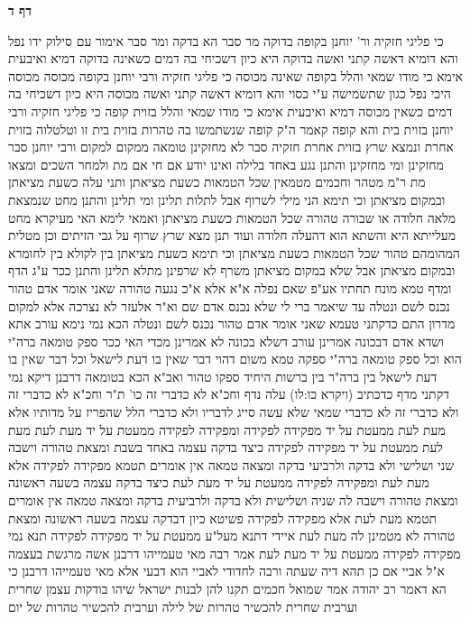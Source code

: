 \documentclass[12pt, openany]{book}
\newcommand{\sethebfont}{
\fontsize{10.5pt}{21.0pt} \selectfont
}
\newcommand{\twocol}[1]{
	{\sethebfont \begin{multicols}{2}
			#1
	\end{multicols}}	
}
\newcommand{\sectname}{}
\newcommand{\newsection}[1]{
	\addcontentsline{toc}{section}{#1}
	\renewcommand{\sectname}{#1}	
	\vspace{-\baselineskip}
	\begin{center}
		\textbf{%
\fontsize{16pt}{16pt}\selectfont
			#1}
	\end{center}
	\vspace{-\baselineskip}
	\nopagebreak
}
\begin{document}
\newsection{דף ד}
\twocol{כי פליגי חזקיה ור' יוחנן בקופה בדוקה מר סבר הא בדקה ומר סבר אימור עם סילוק ידו נפל 
והא דומיא דאשה קתני ואשה בדוקה היא כיון דשכיחי בה דמים כשאינה בדוקה דמיא 
ואיבעית אימא כי מודו שמאי והלל בקופה שאינה מכוסה כי פליגי חזקיה ורבי יוחנן בקופה מכוסה מכוסה היכי נפל כגון שתשמישה ע"י כסוי 
והא דומיא דאשה קתני ואשה מכוסה היא כיון דשכיחי בה דמים כשאין מכוסה דמיא 
ואיבעית אימא כי מודו שמאי והלל בזוית קופה כי פליגי חזקיה ורבי יוחנן בזוית בית והא קופה קאמר 
ה"ק קופה שנשתמשו בה טהרות בזוית בית זו וטלטלוה בזוית אחרת ונמצא שרץ בזוית אחרת חזקיה סבר לא מחזקינן טומאה ממקום למקום ורבי יוחנן סבר מחזקינן 
ומי מחזקינן והתנן נגע באחד בלילה ואינו יודע אם חי אם מת ולמחר השכים ומצאו מת ר"מ מטהר
וחכמים מטמאין שכל הטמאות כשעת מציאתן 
ותני עלה כשעת מציאתן ובמקום מציאתן 
וכי תימא הני מילי לשרוף אבל לתלות תלינן ומי תלינן 
והתנן מחט שנמצאת מלאה חלודה או שבורה טהורה שכל הטמאות כשעת מציאתן ואמאי לימא האי מעיקרא מחט מעלייתא היא והשתא הוא דהעלה חלודה 
ועוד תנן מצא שרץ שרוף על גבי הזיתים וכן מטלית המהומהם טהור שכל הטמאות כשעת מציאתן 
וכי תימא כשעת מציאתן בין לקולא בין לחומרא ובמקום מציאתן אבל שלא במקום מציאתן משרף לא שרפינן מתלא תלינן
והתנן ככר ע"ג הדף ומדף טמא מונח תחתיו אע"פ שאם נפלה א"א אלא א"כ נגעה טהורה שאני אומר אדם טהור נכנס לשם ונטלה
עד שיאמר ברי לי שלא נכנס אדם שם וא"ר אלעזר לא נצרכה אלא למקום מדרון 
התם כדקתני טעמא
שאני אומר אדם טהור נכנס לשם ונטלה 
הכא נמי נימא עורב אתא ושדא אדם דבכונה אמרינן עורב דשלא בכונה לא אמרינן 
מכדי האי ככר ספק טומאה ברה"י הוא וכל ספק טומאה ברה"י ספקה טמא משום דהוי דבר שאין בו דעת לישאל וכל דבר שאין בו דעת לישאל בין ברה"ר בין ברשות היחיד ספקו טהור 
ואב"א הכא בטומאה דרבנן דיקא נמי דקתני מדף כדכתיב (ויקרא כו:לו) עלה נדף
וחכ"א לא כדברי זה כו' ת"ר וחכ"א לא כדברי זה ולא כדברי זה לא כדברי שמאי שלא עשה סייג לדבריו ולא כדברי הלל שהפריז על מדותיו 
אלא מעת לעת ממעטת על יד מפקידה לפקידה ומפקידה לפקידה ממעטת על יד מעת לעת 
מעת לעת ממעטת על יד מפקידה לפקידה כיצד בדקה עצמה באחד בשבת ומצאת טהורה וישבה שני ושלישי ולא בדקה ולרביעי בדקה ומצאה טמאה אין אומרים תטמא מפקידה לפקידה אלא מעת לעת 
ומפקידה לפקידה ממעטת על יד מעת לעת כיצד בדקה עצמה בשעה ראשונה ומצאת טהורה וישבה לה שניה ושלישית ולא בדקה ולרביעית בדקה ומצאה טמאה אין אומרים תטמא מעת לעת אלא מפקידה לפקידה 
פשיטא כיון דבדקה עצמה בשעה ראשונה ומצאת טהורה לא מטמינן לה מעת לעת איידי דתנא מעל"ע ממעטת על יד מפקידה לפקידה תנא נמי מפקידה לפקידה ממעטת על יד מעת לעת 
אמר רבה מאי טעמייהו דרבנן אשה מרגשת בעצמה א"ל אביי אם כן תהא דיה שעתה ורבה לחדודי לאביי הוא דבעי אלא מאי טעמייהו דרבנן 
כי הא דאמר רב יהודה אמר שמואל חכמים תקנו להן לבנות ישראל שיהו בודקות עצמן שחרית וערבית שחרית להכשיר טהרות של לילה וערבית להכשיר טהרות של יום 
}
\end{document}
